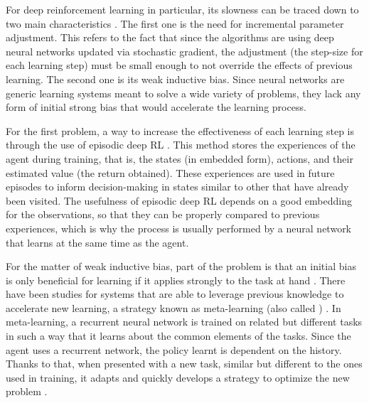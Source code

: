 For deep reinforcement learning in particular, its slowness can be traced down to two main characteristics \cite{Botvinick:2019}. The first one is the need for incremental parameter adjustment. This refers to the fact that since the algorithms are using deep neural networks updated via stochastic gradient, the adjustment (the step-size for each learning step) must be small enough to not override the effects of previous learning. The second one is its weak inductive bias. Since neural networks are generic learning systems meant to solve a wide variety of problems, they lack any form of initial strong bias that would accelerate the learning process.

For the first problem, a way to increase the effectiveness of each learning step is through the use of episodic deep RL \cite{Botvinick:2019,Pritzel:2017}. This method stores the experiences of the agent during training, that is, the states (in embedded form), actions, and their estimated value (the return obtained). These experiences are used in future episodes to inform decision-making in states similar to other that have already been visited. The usefulness of episodic deep RL depends on a good embedding for the observations, so that they can be properly compared to previous experiences, which is why the process is usually performed by a neural network that learns at the same time as the agent.

For the matter of weak inductive bias, part of the problem is that an initial bias is only beneficial for learning if it applies strongly to the task at hand \cite{Botvinick:2019}. There have been studies for systems that are able to leverage previous knowledge to accelerate new learning, a strategy known as meta-learning (also called ) \cite{Botvinick:2019}. In meta-learning, a recurrent neural network is trained on related but different tasks in such a way that it learns about the common elements of the tasks. Since the agent uses a recurrent network, the policy learnt is dependent on the history. Thanks to that, when presented with a new task, similar but different to the ones used in training, it adapts and quickly develops a strategy to optimize the new problem \cite{Wang:2017}.


